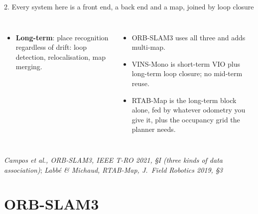 \documentclass[11pt,aspectratio=169]{beamer}
\newcommand{\src}[1]{\vfill{\tiny\color{black!55}#1}}
\newcommand{\paper}[1]{\textit{#1}}
\begin{document}
\begin{frame}{2. Every system here is a front end, a back end and a map, joined by loop closure}
\begin{columns}[T]
\begin{itemize}
              still small; zero drift in mapped areas.
        \item \textbf{Long-term}: place recognition regardless of drift: loop
              detection, relocalisation, map merging.
      \end{itemize}
      \begin{itemize}
        \item ORB-SLAM3 uses all three and adds multi-map.
        \item VINS-Mono is short-term VIO plus long-term loop closure; no
              mid-term reuse.
        \item RTAB-Map is the long-term block alone, fed by whatever odometry
              you give it, plus the occupancy grid the planner needs.
      \end{itemize}
  \end{columns}
  \src{\paper{Campos et al., ORB-SLAM3, IEEE T-RO 2021, §I (three kinds of data association)};
       \paper{Labbé \& Michaud, RTAB-Map, J.\ Field Robotics 2019, §3}}
\end{frame}

\section{ORB-SLAM3}
\end{document}
